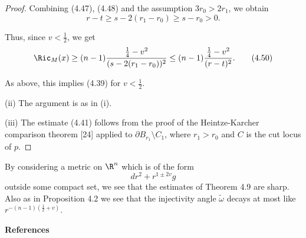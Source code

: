 \begin{proof}
Combining (4.47), (4.48) and the assumption $3r_0 > 2r_1$, we obtain
\begin{equation}
r - t \geq s - 2(r_1 - r_0) \geq s - r_0 > 0.
\tag{4.49}
\end{equation}

Thus, since $v < \frac{1}{2}$, we get
\begin{equation}
\Ric_M(x) \geq (n - 1)\frac{\frac{1}{4} - v^2}{(s - 2(r_1 - r_0))^2}
\leq (n - 1)\frac{\frac{1}{4} - v^2}{(r - t)^2}.
\tag{4.50}
\end{equation}

As above, this implies (4.39) for $v < \frac{1}{2}$.

(ii) The argument is as in (i).

(iii) The estimate (4.41) follows from the proof of the Heintze-Karcher
comparison theorem [24] applied to $\partial B_{r_1}\setminus C_1$, where
$r_1 > r_0$ and $C$ is the cut locus of $p$.
\end{proof}

\begin{remark}
\label{rem:sharpness-volume-growth-estimates}

By considering a metric on $\R^n$ which is of the form
\begin{equation}
dr^2 + r^{1\pm 2v}g
\tag{4.51}
\end{equation}
outside some compact set, we see that the estimates of Theorem 4.9 are sharp.
Also as in Proposition 4.2 we see that the injectivity angle $\tilde{\omega}$
decays at most like $r^{-(n-1)(\frac{1}{2}+v)}$.
\end{remark}

\begin{center}
\textbf{References}
\end{center}

